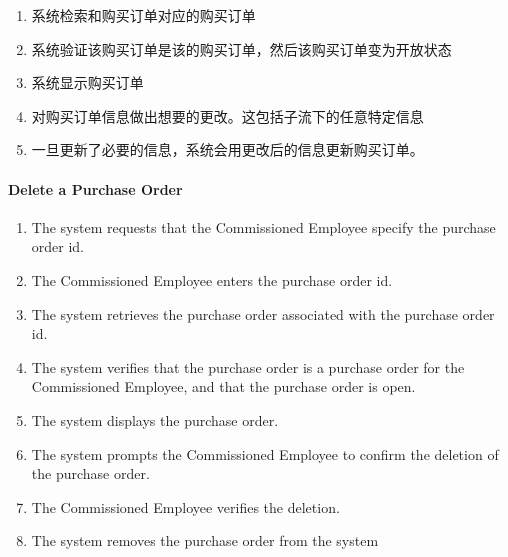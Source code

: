 \documentclass{article}
\begin{document}
\begin{enumerate}
\begin{enumerate}[noitemsep,topsep=\mdcompacttopsep]
\item{}系统检索和购买订单对应的购买订单%

\item{}系统验证该购买订单是该的购买订单，然后该购买订单变为开放状态%

\item{}系统显示购买订单%

\item{}对购买订单信息做出想要的更改。这包括子流下的任意特定信息%

\item{}一旦更新了必要的信息，系统会用更改后的信息更新购买订单。%
\end{enumerate}%

\paragraph{Delete a Purchase Order}\label{sec-delete-a-purchase-order}%

\begin{enumerate}[noitemsep,topsep=\mdcompacttopsep]%

\item{}The system requests that the Commissioned Employee specify the purchase order id.%

\item{}The Commissioned Employee enters the purchase order id.%

\item{}The system retrieves the purchase order associated with the purchase order id.%

\item{}The system verifies that the purchase order is a purchase order for the Commissioned Employee, and
that the purchase order is open.%

\item{}The system displays the purchase order.%

\item{}The system prompts the Commissioned Employee to confirm the deletion of the purchase order.%

\item{}The Commissioned Employee verifies the deletion.%

\item{}The system removes the purchase order from the system%
\end{enumerate}%
\end{enumerate}%
\end{document}
